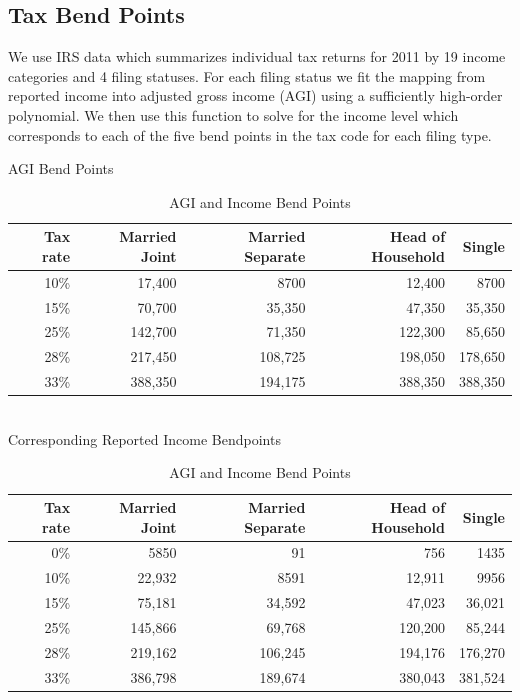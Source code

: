 \documentclass[12pt]{report}
\theoremstyle{definition}
\begin{document}
  \subsection{Tax Bend Points}
      We use IRS data which summarizes individual tax returns for 2011 by 19 income categories and 4 filing statuses.  For each filing status we fit the mapping from reported income into adjusted gross income (AGI) using a sufficiently high-order polynomial.  We then use this function to solve for the income level which corresponds to each of the five bend points in the tax code for each filing type.
      \begin{table}[ht]
        \caption{AGI and Income Bend Points}
        \label{Calib_Bend_Tab1}
        \centering
        AGI Bend Points
        \begin{tabular}{|r|r|r|r|r|} \hline 
          Tax rate & Married Joint & Married Separate & Head of Household & Single \\ \hline 
          10\% & 17,400 & 8700 & 12,400 & 8700 \\ \hline 
          15\% & 70,700 & 35,350 & 47,350 & 35,350 \\ \hline 
          25\% & 142,700 & 71,350 & 122,300 & 85,650 \\ \hline 
          28\% & 217,450 & 108,725 & 198,050 & 178,650 \\ \hline 
          33\% & 388,350 & 194,175 & 388,350 & 388,350 \\ \hline 
        \end{tabular}
        \\
        Corresponding Reported Income Bendpoints
        \begin{tabular}{|r|r|r|r|r|} \hline 
          Tax rate & Married Joint & Married Separate & Head of Household & Single \\ \hline 
          0\%  & 5850  & 91 & 756 & 1435 \\ \hline 
          10\% & 22,932 & 8591 & 12,911 & 9956 \\ \hline 
          15\% & 75,181 & 34,592 & 47,023 & 36,021 \\ \hline 
          25\% & 145,866 & 69,768 & 120,200 & 85,244 \\ \hline 
          28\% & 219,162 & 106,245 & 194,176 & 176,270 \\ \hline 
          33\% & 386,798 & 189,674 & 380,043 & 381,524 \\ \hline 
        \end{tabular}
      \end{table}
\end{document}
